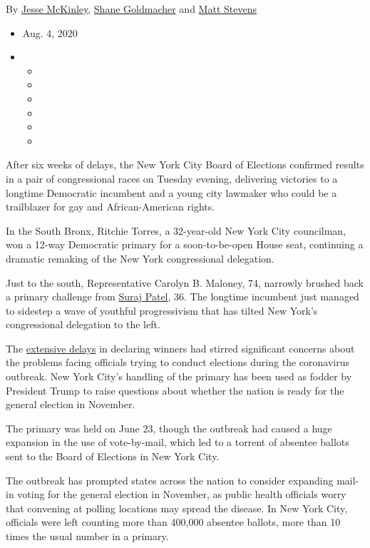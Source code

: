 By \href{https://www.nytimes.com/by/jesse-mckinley}{Jesse McKinley},
\href{https://www.nytimes.com/by/shane-goldmacher}{Shane Goldmacher} and
\href{https://www.nytimes.com/by/matt-stevens}{Matt Stevens}

\begin{itemize}
\item
  Aug. 4, 2020
\item
  \begin{itemize}
  \item
  \item
  \item
  \item
  \item
  \item
  \end{itemize}
\end{itemize}

After six weeks of delays, the New York City Board of Elections
confirmed results in a pair of congressional races on Tuesday evening,
delivering victories to a longtime Democratic incumbent and a young city
lawmaker who could be a trailblazer for gay and African-American rights.

In the South Bronx, Ritchie Torres, a 32-year-old New York City
councilman, won a 12-way Democratic primary for a soon-to-be-open House
seat, continuing a dramatic remaking of the New York congressional
delegation.

Just to the south, Representative Carolyn B. Maloney, 74, narrowly
brushed back a primary challenge from
\href{https://www.nytimes.com/2018/06/21/nyregion/congress-primaries-democrats-midterm-ny.html}{Suraj
Patel}, 36. The longtime incumbent just managed to sidestep a wave of
youthful progressivism that has tilted New York's congressional
delegation to the left.

The
\href{https://www.nytimes.com/2020/08/03/nyregion/nyc-mail-ballots-voting.html}{extensive
delays} in declaring winners had stirred significant concerns about the
problems facing officials trying to conduct elections during the
coronavirus outbreak. New York City's handling of the primary has been
used as fodder by President Trump to raise questions about whether the
nation is ready for the general election in November.

The primary was held on June 23, though the outbreak had caused a huge
expansion in the use of vote-by-mail, which led to a torrent of absentee
ballots sent to the Board of Elections in New York City.

The outbreak has prompted states across the nation to consider expanding
mail-in voting for the general election in November, as public health
officials worry that convening at polling locations may spread the
disease. In New York City, officials were left counting more than
400,000 absentee ballots, more than 10 times the usual number in a
primary.


